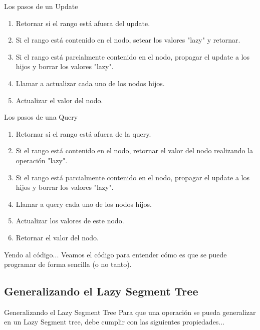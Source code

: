 \documentclass{beamer}
\begin{document}
\begin{frame}{Los pasos de un Update}
\begin{enumerate}
    \item Retornar si el rango está afuera del update.
    \pause
    \item Si el rango está contenido en el nodo, setear los valores "lazy" y retornar.
    \pause
    \item Si el rango está parcialmente contenido en el nodo, propagar el update a los hijos y borrar los valores "lazy".
    \pause
    \item Llamar a actualizar cada uno de los nodos hijos.
    \pause
    \item Actualizar el valor del nodo.
\end{enumerate}
\end{frame}


\begin{frame}{Los pasos de una Query}
\begin{enumerate}
    \item Retornar si el rango está afuera de la query.
    \pause
    \item Si el rango está contenido en el nodo, retornar el valor del nodo realizando la operación "lazy".
    \pause
    \item Si el rango está parcialmente contenido en el nodo, propagar el update a los hijos y borrar los valores "lazy".
    \pause
    \item Llamar a query cada uno de los nodos hijos.
    \pause
    \item Actualizar los valores de este nodo.
    \pause
    \item Retornar el valor del nodo.
\end{enumerate}
\end{frame}

\begin{frame}{Yendo al código...}
Veamos el código para entender cómo es que se puede programar de forma sencilla (o no tanto).
\end{frame}

\subsection{Generalizando el Lazy Segment Tree}
\begin{frame}{Generalizando el Lazy Segment Tree}
Para que una operación se pueda generalizar en un Lazy Segment tree, debe cumplir con las siguientes propiedades...
\end{frame}
\end{document}
